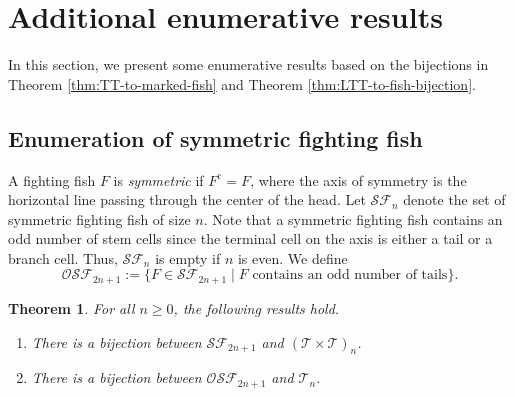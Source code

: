 \documentclass[a4paper,11pt,reqno]{amsart}
\newtheorem{thm}[lem]{Theorem}
\theoremstyle{definition}
\numberwithin{equation}{section}
\newcommand{\cc}{{\mathrm{c}}}
\newcommand{\SF}{{\mathcal{SF}}}
\newcommand{\OSF}{{\mathcal{OSF}}}
\newcommand{\T}{{\mathcal{T}}}
\begin{document}
\section{Additional enumerative results} \label{sec:additional}
In this section, we present some enumerative results based on the bijections in Theorem \ref{thm:TT-to-marked-fish} and Theorem \ref{thm:LTT-to-fish-bijection}.








\subsection{Enumeration of symmetric fighting fish}
A fighting fish $F$ is \emph{symmetric} if $F^{\cc}=F$, where the axis of symmetry is the horizontal line passing through the center of the head. Let $\SF_n$ denote the set of symmetric fighting fish of size $n$.
Note that a symmetric fighting fish contains an odd number of stem cells since the terminal cell on the axis is either a tail or a branch cell. Thus, $\SF_n$ is empty if $n$ is even. We define
\begin{equation}
\OSF_{2n+1} :=\{F\in\SF_{2n+1}\mid \mbox{$F$ contains an odd number of tails} \}.
\end{equation}


\begin{thm} \label{thm:SFF_enumeration} For all $n\ge 0$, the following results hold.
\begin{enumerate}
\item There is a bijection between $\SF_{2n+1}$ and $(\T\times\T)_n$.
\item There is a bijection between $\OSF_{2n+1}$ and $\T_n$.
\end{enumerate}
\end{thm}
\end{document}
